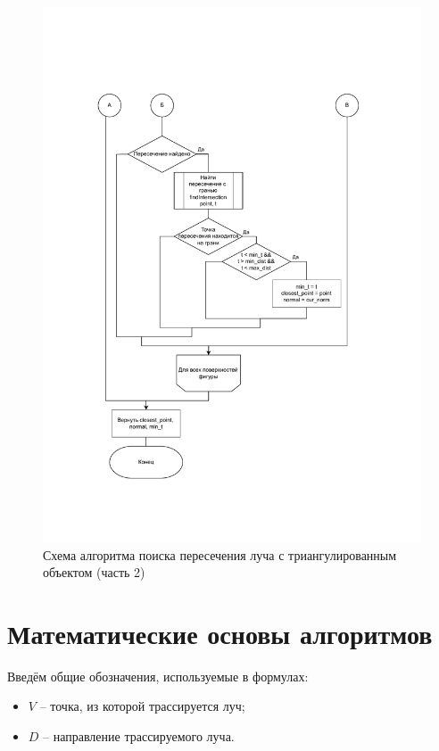\begin{figure}[H]
	\begin{center}
		\includegraphics[width=\linewidth]{img/tr_intersection_2.pdf}
	\end{center}
	\captionsetup{justification=centering}
	\caption{Схема алгоритма поиска пересечения луча с триангулированным объектом (часть 2)}
	\label{img:tr_intersection_2}
\end{figure}

\section{Математические основы алгоритмов}

Введём общие обозначения, используемые в формулах:

\begin{itemize}[label=---]
    \item $V$ -- точка, из которой трассируется луч;
    \item $D$ -- направление трассируемого луча.
\end{itemize}

